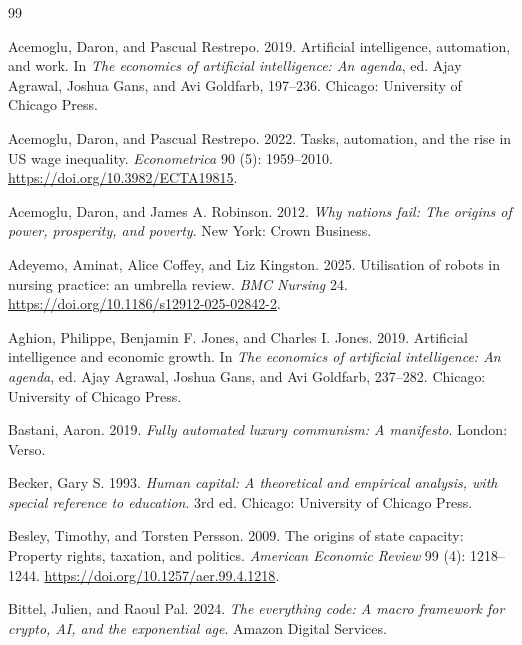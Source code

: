 \documentclass[11pt]{article}
\begin{document}
\begin{thebibliography}{99}

Acemoglu, Daron, and Pascual Restrepo. 2019. Artificial intelligence, automation, and work. In \textit{The economics of artificial intelligence: An agenda}, ed. Ajay Agrawal, Joshua Gans, and Avi Goldfarb, 197--236. Chicago: University of Chicago Press.

Acemoglu, Daron, and Pascual Restrepo. 2022. Tasks, automation, and the rise in US wage inequality. \textit{Econometrica} 90 (5): 1959--2010. \url{https://doi.org/10.3982/ECTA19815}.

Acemoglu, Daron, and James A. Robinson. 2012. \textit{Why nations fail: The origins of power, prosperity, and poverty}. New York: Crown Business.

Adeyemo, Aminat, Alice Coffey, and Liz Kingston. 2025. Utilisation of robots in nursing practice: an umbrella review. \textit{BMC Nursing} 24. \url{https://doi.org/10.1186/s12912-025-02842-2}.

Aghion, Philippe, Benjamin F. Jones, and Charles I. Jones. 2019. Artificial intelligence and economic growth. In \textit{The economics of artificial intelligence: An agenda}, ed. Ajay Agrawal, Joshua Gans, and Avi Goldfarb, 237--282. Chicago: University of Chicago Press.


Bastani, Aaron. 2019. \textit{Fully automated luxury communism: A manifesto}. London: Verso.

Becker, Gary S. 1993. \textit{Human capital: A theoretical and empirical analysis, with special reference to education}. 3rd ed. Chicago: University of Chicago Press.

Besley, Timothy, and Torsten Persson. 2009. The origins of state capacity: Property rights, taxation, and politics. \textit{American Economic Review} 99 (4): 1218--1244. \url{https://doi.org/10.1257/aer.99.4.1218}.

Bittel, Julien, and Raoul Pal. 2024. \textit{The everything code: A macro framework for crypto, AI, and the exponential age}. Amazon Digital Services.


\end{thebibliography}
\end{document}
